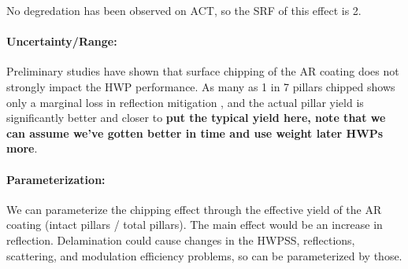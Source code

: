 No degredation has been observed on ACT, so the SRF of this effect is 2.


\paragraph{Uncertainty/Range:}


Preliminary studies have shown that surface chipping of the AR coating does not strongly impact the HWP performance. As many as 1 in 7 pillars chipped shows only a marginal loss in reflection mitigation \cite{SiAR_1}, and the actual pillar yield is significantly better and closer to \textbf{put the typical yield here, note that we can assume we've gotten better in time and use weight later HWPs more}.


\paragraph{Parameterization:}
We can parameterize the chipping effect through the effective yield of the AR coating (intact pillars / total pillars). The main effect would be an increase in reflection. Delamination could cause changes in the HWPSS, reflections, scattering, and modulation efficiency problems, so can be parameterized by those.

